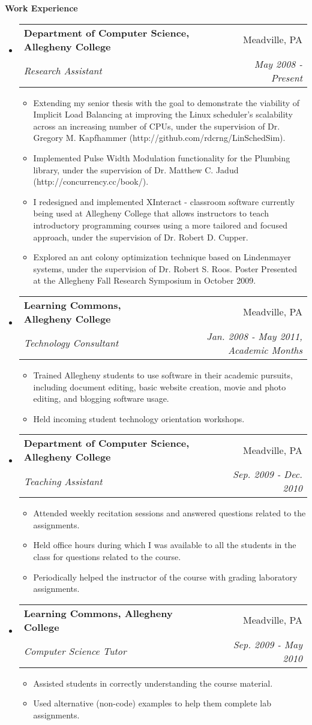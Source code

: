 \documentclass[letterpaper,12pt]{article}
\makeatletter
\newcommand{\resitem}[1]{\item #1 \vspace{-2pt}}
\newcommand{\resheading}[1]{{\large \colorbox{mygrey}{\begin{minipage}{\textwidth}{\textbf{#1 \vphantom{p\^{E}}}}\end{minipage}}}}
\newcommand{\ressubheading}[4]{
\begin{tabular*}{7.0in}{l@{\extracolsep{\fill}}r}
		\textbf{#1} & #2 \\
		\textit{#3} & \textit{#4} \\
\end{tabular*}\vspace{-6pt}}
\makeatother
\begin{document}
\resheading{Work Experience}
\begin{itemize}
\item
	\ressubheading{Department of Computer Science, Allegheny College}{Meadville, PA}{Research Assistant}{May 2008 - Present}
	\begin{itemize}
	    \resitem{Extending my senior thesis with the goal to demonstrate the viability of Implicit Load Balancing at improving the Linux scheduler's scalability across an increasing number of CPUs, under the supervision of Dr. Gregory M. Kapfhammer (http://github.com/rdcrng/LinSchedSim).}
		\resitem{Implemented Pulse Width Modulation functionality for the Plumbing library, under the supervision of Dr. Matthew C. Jadud (http://concurrency.cc/book/).}
		\resitem{I redesigned and implemented XInteract - classroom software currently being used at Allegheny College that allows instructors to teach introductory programming courses using a more tailored and focused approach, under the supervision of Dr. Robert D. Cupper.}
		\resitem{Explored an ant colony optimization technique based on Lindenmayer systems, under the supervision of Dr. Robert S. Roos. Poster Presented at the Allegheny Fall Research Symposium in October 2009.}
	\end{itemize}
	
\item
	\ressubheading{Learning Commons, Allegheny College}{Meadville, PA}{Technology Consultant}{Jan. 2008 - May 2011, Academic Months}
	\begin{itemize}
		\resitem{Trained Allegheny students to use software in their academic pursuits, including document editing, basic website creation, movie and photo editing, and blogging software usage.}
		\resitem{Held incoming student technology orientation workshops.}
	\end{itemize}

\item
	\ressubheading{Department of Computer Science, Allegheny College}{Meadville, PA}{Teaching Assistant}{Sep. 2009 - Dec. 2010}
	\begin{itemize}
		\resitem{Attended weekly recitation sessions and answered questions related to the assignments.}
		\resitem{Held office hours during which I was available to all the students in the class for questions related to the course.}
		\resitem{Periodically helped the instructor of the course with grading laboratory assignments.}
	\end{itemize}

\item
	\ressubheading{Learning Commons, Allegheny College}{Meadville, PA}{Computer Science Tutor}{Sep. 2009 - May 2010}
	\begin{itemize}
		\resitem{Assisted students in correctly understanding the course material.}
		\resitem{Used alternative (non-code) examples to help them complete lab assignments.}
	\end{itemize}
	
\end{itemize}
\end{document}
